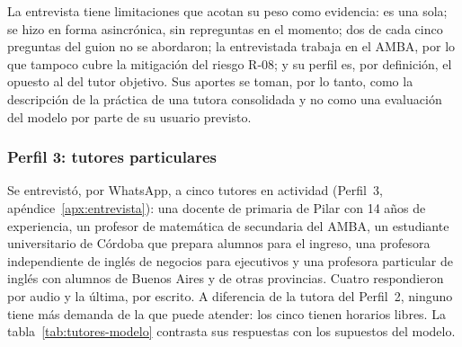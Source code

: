 La entrevista tiene limitaciones que acotan su peso como evidencia: es
una sola; se hizo en forma asincrónica, sin repreguntas en el momento;
dos de cada cinco preguntas del guion no se abordaron; la entrevistada trabaja en el AMBA,
por lo que tampoco cubre la mitigación del riesgo R-08; y su perfil es,
por definición, el opuesto al del tutor objetivo. Sus aportes se toman,
por lo tanto, como la descripción de la práctica de una tutora
consolidada y no como una evaluación del modelo por parte de su usuario
previsto.

\subsubsection{Perfil 3: tutores particulares}\label{sec:resultados-perfil3}

Se entrevistó, por WhatsApp, a cinco tutores en actividad
(Perfil~3, apéndice~\ref{apx:entrevista}): una docente de primaria de
Pilar con 14 años de experiencia, un profesor de matemática de
secundaria del AMBA, un estudiante universitario de Córdoba que prepara
alumnos para el ingreso, una profesora independiente de inglés de
negocios para ejecutivos y una profesora particular de inglés con
alumnos de Buenos Aires y de otras provincias. Cuatro respondieron por
audio y la última, por escrito. A diferencia de la tutora del Perfil~2,
ninguno tiene más demanda de la que puede atender: los cinco tienen
horarios libres. La tabla~\ref{tab:tutores-modelo} contrasta sus respuestas con los
supuestos del modelo.

